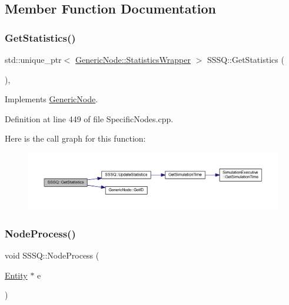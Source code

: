 \subsection{Member Function Documentation}
\mbox{\label{class_s_s_s_q_ad8f307b8a4609d28efcc122dddfe5120}} 
\subsubsection{\texorpdfstring{Get\+Statistics()}{GetStatistics()}}
{\footnotesize\ttfamily std\+::unique\+\_\+ptr$<$ \hyperlink{class_generic_node_1_1_statistics_wrapper}{Generic\+Node\+::\+Statistics\+Wrapper} $>$ S\+S\+S\+Q\+::\+Get\+Statistics (\begin{DoxyParamCaption}{ }\end{DoxyParamCaption})\hspace{0.3cm}{\ttfamily [override]}, {\ttfamily [virtual]}}



Implements \hyperlink{class_generic_node_ae7c8424c8c14fd3de993c902d78deb67}{Generic\+Node}.



Definition at line 449 of file Specific\+Nodes.\+cpp.

Here is the call graph for this function\+:
\nopagebreak
\begin{figure}[H]
\begin{center}
\leavevmode
\includegraphics[width=350pt]{class_s_s_s_q_ad8f307b8a4609d28efcc122dddfe5120_cgraph}
\end{center}
\end{figure}
\mbox{\label{class_s_s_s_q_a21ff1a4817052985747b6df51bf5d643}} 
\subsubsection{\texorpdfstring{Node\+Process()}{NodeProcess()}}
{\footnotesize\ttfamily void S\+S\+S\+Q\+::\+Node\+Process (\begin{DoxyParamCaption}\item[{\hyperlink{class_entity}{Entity} $\ast$}]{e }\end{DoxyParamCaption})\hspace{0.3cm}{\ttfamily [virtual]}}



